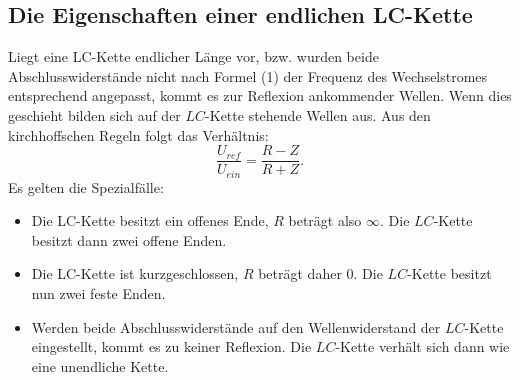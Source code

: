 \subsection{Die Eigenschaften einer endlichen LC-Kette}
Liegt eine LC-Kette endlicher Länge vor, bzw. wurden beide Abschlusswiderstände
 nicht nach Formel (1) der Frequenz des Wechselstromes entsprechend angepasst,
  kommt es zur Reflexion ankommender Wellen. Wenn dies geschieht bilden sich auf der
   $LC$-Kette stehende Wellen aus. Aus den kirchhoffschen Regeln folgt das Verhältnis:
  \begin{equation}
    \frac{U_{ref}}{U_{ein}} = \frac{R-Z}{R+Z}\text{.}
  \end{equation}
  Es gelten die Spezialfälle:\\
\begin{itemize}
  \item Die LC-Kette besitzt ein offenes Ende, $R$ beträgt also $\infty$. Die $LC$-Kette
   besitzt dann zwei offene Enden.\\

  \item Die LC-Kette ist kurzgeschlossen, $R$ beträgt daher 0. Die $LC$-Kette besitzt nun zwei
  feste Enden.\\

 \item Werden beide Abschlusswiderstände auf den Wellenwiderstand der $LC$-Kette eingestellt,
  kommt es zu keiner Reflexion. Die $LC$-Kette verhält sich dann wie eine unendliche Kette.
\end{itemize}
